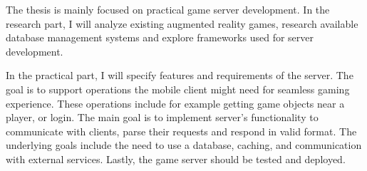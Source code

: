 The thesis is mainly focused on practical game server development. In the research part, I will analyze existing augmented reality games, research available database management systems and explore frameworks used for server development.

In the practical part, I will specify features and requirements of the server. The goal is to support operations the mobile client might need for seamless gaming experience. These operations include for example getting game objects near a player, or login. The main goal is to implement server's functionality to communicate with clients, parse their requests and respond in valid format. The underlying goals include the need to use a database, caching, and communication with external services. Lastly, the game server should be tested and deployed.	